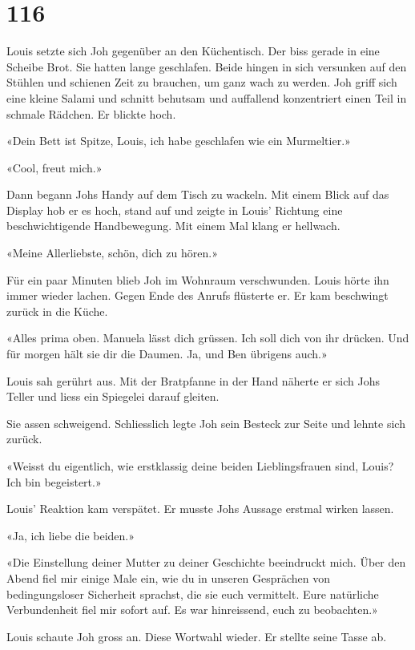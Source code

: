 \chapter{116}



Louis setzte sich Joh gegenüber an den Küchentisch. Der biss gerade in
eine Scheibe Brot. Sie hatten lange geschlafen. Beide hingen in sich
versunken auf den Stühlen und schienen Zeit zu brauchen, um ganz wach zu
werden. Joh griff sich eine kleine Salami und schnitt behutsam und
auffallend konzentriert einen Teil in schmale Rädchen. Er blickte hoch.

«Dein Bett ist Spitze, Louis, ich habe geschlafen wie ein Murmeltier.»

«Cool, freut mich.»

Dann begann Johs Handy auf dem Tisch zu wackeln. Mit einem Blick auf das
Display hob er es hoch, stand auf und zeigte in Louis’ Richtung eine
beschwichtigende Handbewegung.
Mit einem Mal klang er hellwach.

«Meine Allerliebste, schön, dich zu hören.»

Für ein paar Minuten blieb Joh im Wohnraum verschwunden. Louis hörte ihn
immer wieder lachen. Gegen Ende des Anrufs flüsterte er. Er kam
beschwingt zurück in die Küche.

«Alles prima oben. Manuela lässt dich grüssen. Ich soll dich von ihr
drücken. Und für morgen hält sie dir die Daumen. Ja, und Ben übrigens
auch.»

Louis sah gerührt aus. Mit der Bratpfanne in der Hand näherte er sich
Johs Teller und liess ein Spiegelei darauf gleiten.

Sie assen schweigend. Schliesslich legte Joh sein Besteck zur Seite und
lehnte sich zurück.

«Weisst du eigentlich, wie erstklassig deine beiden Lieblingsfrauen sind,
Louis? Ich bin begeistert.»

Louis’ Reaktion kam verspätet. Er musste Johs Aussage erstmal wirken
lassen.

«Ja, ich liebe die beiden.»

«Die Einstellung deiner Mutter zu deiner Geschichte beeindruckt mich. Über
den Abend fiel mir einige Male ein, wie du in unseren Gesprächen von
bedingungsloser Sicherheit sprachst, die sie euch vermittelt.
Eure natürliche Verbundenheit fiel mir sofort auf. Es war hinreissend,
euch zu beobachten.»

Louis schaute Joh gross an. Diese Wortwahl wieder. Er stellte seine
Tasse ab.

